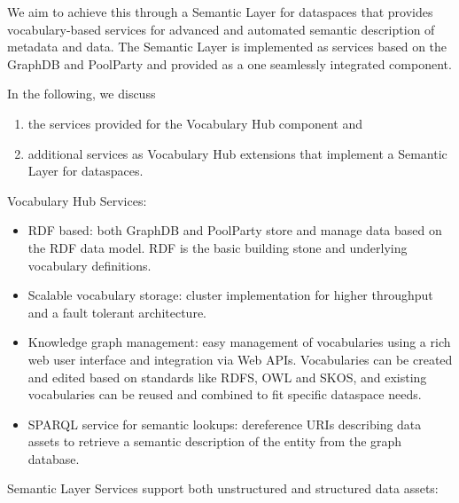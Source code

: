\documentclass[
  super,
  preprint,
  3p]{elsarticle}
\providecommand{\tightlist}{%
  \setlength{\itemsep}{0pt}\setlength{\parskip}{0pt}}\usepackage{longtable,booktabs,array}
\begin{document}
We aim to achieve this through a Semantic Layer for dataspaces that
provides vocabulary-based services for advanced and automated semantic
description of metadata and data. The Semantic Layer is implemented as
services based on the GraphDB and PoolParty and provided as a one
seamlessly integrated component.

In the following, we discuss

\begin{enumerate}
\def\labelenumi{\roman{enumi})}
\tightlist
\item
  the services provided for the Vocabulary Hub component and
\item
  additional services as Vocabulary Hub extensions that implement a
  Semantic Layer for dataspaces.
\end{enumerate}

Vocabulary Hub Services:

\begin{itemize}
\tightlist
\item
  RDF based: both GraphDB and PoolParty store and manage data based on
  the RDF data model. RDF is the basic building stone and underlying
  vocabulary definitions.
\item
  Scalable vocabulary storage: cluster implementation for higher
  throughput and a fault tolerant architecture.
\item
  Knowledge graph management: easy management of vocabularies using a
  rich web user interface and integration via Web APIs. Vocabularies can
  be created and edited based on standards like RDFS, OWL and SKOS, and
  existing vocabularies can be reused and combined to fit specific
  dataspace needs.
\item
  SPARQL service for semantic lookups: dereference URIs describing data
  assets to retrieve a semantic description of the entity from the graph
  database.
\end{itemize}

Semantic Layer Services support both unstructured and structured data
assets:
\end{document}
